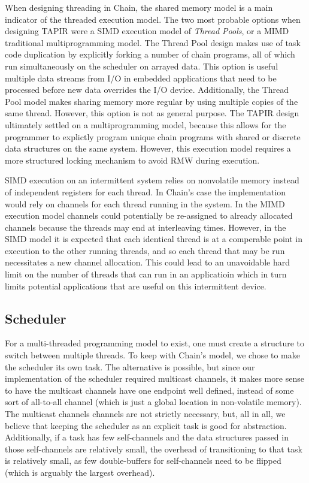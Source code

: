\documentclass[11pt]{sensys-proc}
\newcommand{\chain}{Chain\xspace}
\begin{document}
When designing threading in Chain, the shared memory model is a main indicator
of the threaded execution model. The two most probable options when designing
TAPIR were a SIMD execution model of \textit{Thread Pools}, or a MIMD
traditional multiprogramming model. The Thread Pool design makes use of task
code duplication by explicitly forking a number of chain programs, all of which
run simultaneously on the scheduler on arrayed data. This option is useful
multiple data streams from I/O in embedded applications that need to be
processed before new data overrides the I/O device. Additionally, the Thread
Pool model makes sharing memory more regular by using multiple copies of the
same thread. However, this option is not as general purpose. The TAPIR design
ultimately settled on a multiprogramming model, because this allows for the
programmer to explictly program unique chain programs with shared or discrete
data structures on the same system. However, this execution model requires a
more structured locking mechanism to avoid RMW during execution.

SIMD execution on an intermittent system relies on nonvolatile memory instead
of independent registers for each thread. In Chain's case the implementation
would rely on channels for each thread running in the system. In the MIMD
execution model channels could potentially be re-assigned to already allocated
channels because the threads may end at interleaving times. However, in the
SIMD model it is expected that each identical thread is at a comperable point
in execution to the other running threads, and so each thread that may be
run necessitates a new channel allocation. This could lead to an unavoidable
hard limit on the number of threads that can run in an applicatioin which in
turn limits potential applications that are useful on this intermittent device.


\subsection{Scheduler}
For a multi-threaded programming model to exist, one must create a structure to
switch between multiple threads. To keep with \chain's model, we chose to make
the scheduler its own task. The alternative is possible, but since our
implementation of the scheduler required multicast channels, it makes more
sense to have the multicast channels have one endpoint well defined, instead of
some sort of all-to-all channel (which is just a global location in
non-volatile memory). The multicast channels channels are not strictly
necessary, but, all in all, we believe that keeping the scheduler as an
explicit task is good for abstraction. Additionally, if a task has few
self-channels and the data structures passed in those self-channels are
relatively small, the overhead of transitioning to that task is relatively
small, as few double-buffers for self-channels need to be flipped (which is
arguably the largest overhead).
\end{document}

